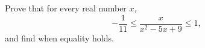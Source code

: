Prove that for every real number $x$,
\[-\dfrac{1}{11}\le\dfrac{x}{x^2-5x+9}\le1,\]
and find when equality holds.
